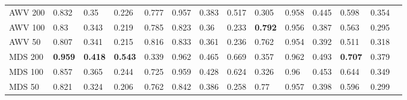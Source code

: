 {\begin{landscape}
\begin{table}[]
\begin{tabular}{llllllllllllll}
AWV 200    & 0.832                           & 0.35                            & 0.226                           & 0.777                           & 0.957                           & 0.383                           & 0.517                           & 0.305                           & 0.958                           & 0.445                           & 0.598                           & 0.354                           &                                 \\
AWV 100    & 0.83                            & 0.343                           & 0.219                           & 0.785                           & 0.823                           & 0.36                            & 0.233                           & \textbf{0.792} & 0.956                           & 0.387                           & 0.563                           & 0.295                           &                                 \\
AWV 50     & 0.807                           & 0.341                           & 0.215                           & 0.816                           & 0.833                           & 0.361                           & 0.236                           & 0.762                           & 0.954                           & 0.392                           & 0.511                           & 0.318                           &                                 \\
MDS 200    & \textbf{0.959} & \textbf{0.418} & \textbf{0.543} & 0.339                           & 0.962                           & 0.465                           & 0.669                           & 0.357                           & 0.962                           & 0.493                           & \textbf{0.707} & 0.379                           &                                 \\
MDS 100    & 0.857                           & 0.365                           & 0.244                           & 0.725                           & 0.959                           & 0.428                           & 0.624                           & 0.326                           & 0.96                            & 0.453                           & 0.644                           & 0.349                           &                                 \\
MDS 50     & 0.821                           & 0.324                           & 0.206                           & 0.762                           & 0.842                           & 0.386                           & 0.258                           & 0.77                            & 0.957                           & 0.398                           & 0.596                           & 0.299                           &                                 \\

\end{tabular}
\end{table}
\end{landscape}}
